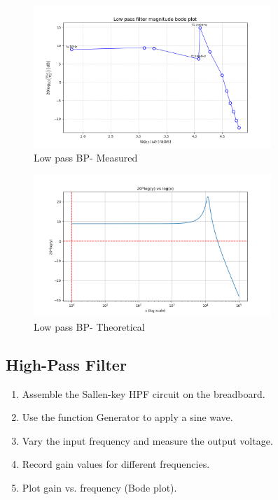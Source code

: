 \documentclass[a4paper,12pt]{article}
\begin{document}
\begin{figure}[H]
    \centering
    \includegraphics[width=0.8\textwidth]{fig/lpb.png}
    \caption{Low pass BP- Measured}
    \label{fig:your-label}
\end{figure}

\begin{figure}[H]
    \centering
    \includegraphics[width=0.8\textwidth]{lpfp.png}
    \caption{Low pass BP- Theoretical}
    \label{fig:your-label}
\end{figure}


\subsection{High-Pass Filter}
\begin{enumerate}
     \item Assemble the Sallen-key HPF circuit on the breadboard.
    \item Use the function Generator to apply a sine wave.
    \item Vary the input frequency and measure the output voltage.
    \item Record gain values for different frequencies.
    \item Plot gain vs. frequency (Bode plot).
\end{enumerate}
\end{document}
